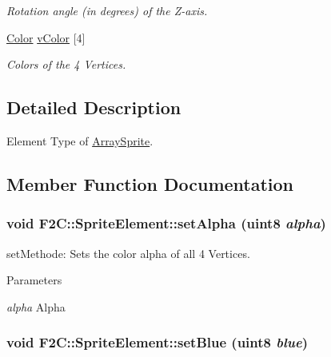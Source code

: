\begin{DoxyCompactItemize}
\begin{DoxyCompactList}\small\item\em Rotation angle (in degrees) of the Z-\/axis. \item\end{DoxyCompactList}\item 
\hyperlink{class_f2_c_1_1_color}{Color} \hyperlink{class_f2_c_1_1_sprite_element_ad6fa2c39e687e33c0dd98b7003f048b9}{vColor} \mbox{[}4\mbox{]}
\begin{DoxyCompactList}\small\item\em Colors of the 4 Vertices. \item\end{DoxyCompactList}\end{DoxyCompactItemize}


\subsection{Detailed Description}
Element Type of \hyperlink{class_f2_c_1_1_array_sprite}{ArraySprite}. 

\subsection{Member Function Documentation}
\hypertarget{class_f2_c_1_1_sprite_element_afb53f0d5935433775cefeee7b242fa16}{
\subsubsection[{setAlpha}]{\setlength{\rightskip}{0pt plus 5cm}void F2C::SpriteElement::setAlpha ({\bf uint8} {\em alpha})}}
\label{class_f2_c_1_1_sprite_element_afb53f0d5935433775cefeee7b242fa16}


setMethode: Sets the color alpha of all 4 Vertices. 
\begin{DoxyParams}{Parameters}
\item[{\em alpha}]Alpha \end{DoxyParams}
\hypertarget{class_f2_c_1_1_sprite_element_a283ac50f4fe67aac7028eb1fc1e0ae6d}{
\subsubsection[{setBlue}]{\setlength{\rightskip}{0pt plus 5cm}void F2C::SpriteElement::setBlue ({\bf uint8} {\em blue})}}
\label{class_f2_c_1_1_sprite_element_a283ac50f4fe67aac7028eb1fc1e0ae6d}


